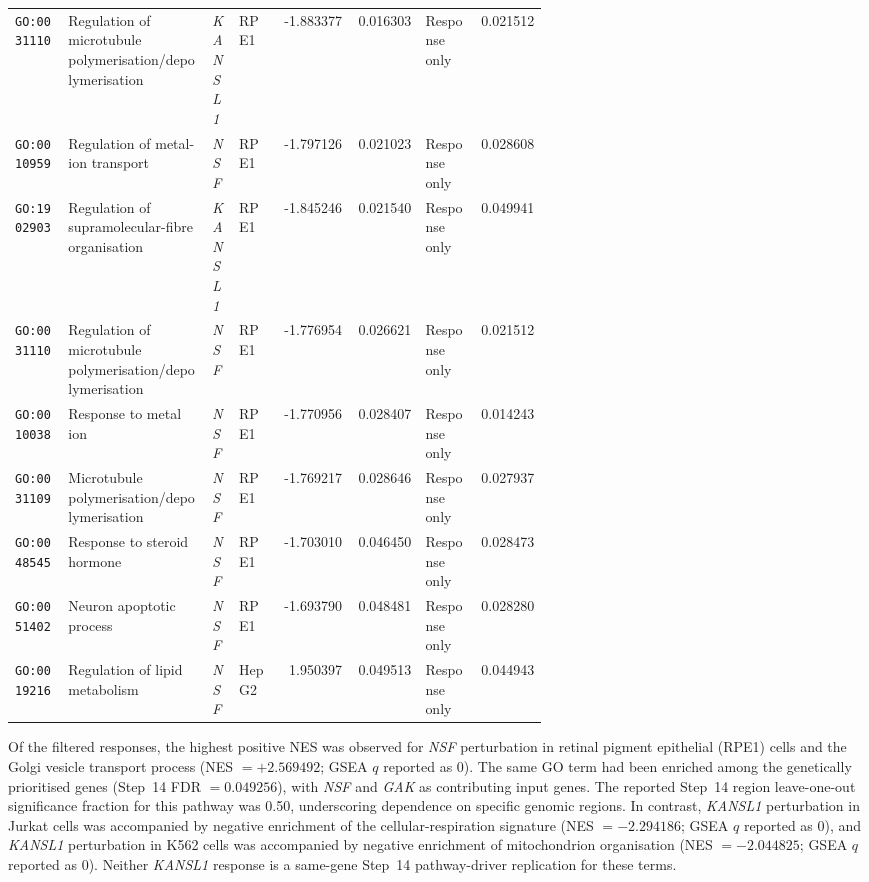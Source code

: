 \documentclass[11pt,a4paper]{article}
\begin{document}
\begin{landscape}
\begin{longtable}{@{}p{0.105\linewidth}p{0.275\linewidth}p{0.058\linewidth}p{0.085\linewidth}r r p{0.10\linewidth}r@{}}
\texttt{GO:0031110} & Regulation of microtubule polymerisation/depolymerisation & \textit{KANSL1} & RPE1 & -1.883377 & 0.016303 & Response only & 0.021512 \\

\texttt{GO:0010959} & Regulation of metal-ion transport & \textit{NSF} & RPE1 & -1.797126 & 0.021023 & Response only & 0.028608 \\

\texttt{GO:1902903} & Regulation of supramolecular-fibre organisation & \textit{KANSL1} & RPE1 & -1.845246 & 0.021540 & Response only & 0.049941 \\

\texttt{GO:0031110} & Regulation of microtubule polymerisation/depolymerisation & \textit{NSF} & RPE1 & -1.776954 & 0.026621 & Response only & 0.021512 \\

\texttt{GO:0010038} & Response to metal ion & \textit{NSF} & RPE1 & -1.770956 & 0.028407 & Response only & 0.014243 \\

\texttt{GO:0031109} & Microtubule polymerisation/depolymerisation & \textit{NSF} & RPE1 & -1.769217 & 0.028646 & Response only & 0.027937 \\

\texttt{GO:0048545} & Response to steroid hormone & \textit{NSF} & RPE1 & -1.703010 & 0.046450 & Response only & 0.028473 \\

\texttt{GO:0051402} & Neuron apoptotic process & \textit{NSF} & RPE1 & -1.693790 & 0.048481 & Response only & 0.028280 \\

\texttt{GO:0019216} & Regulation of lipid metabolism & \textit{NSF} & HepG2 & 1.950397 & 0.049513 & Response only & 0.044943 \\

\end{longtable}
\endgroup
\end{landscape}

\noindent Of the filtered responses, the highest positive NES was observed for \textit{NSF} perturbation in retinal pigment epithelial (RPE1) cells and the Golgi vesicle transport process (NES $=+2.569492$; GSEA $q$ reported as 0). The same GO term had been enriched among the genetically prioritised genes (Step~14 FDR $=0.049256$), with \textit{NSF} and \textit{GAK} as contributing input genes. The reported Step~14 region leave-one-out significance fraction for this pathway was 0.50, underscoring dependence on specific genomic regions. In contrast, \textit{KANSL1} perturbation in Jurkat cells was accompanied by negative enrichment of the cellular-respiration signature (NES $=-2.294186$; GSEA $q$ reported as 0), and \textit{KANSL1} perturbation in K562 cells was accompanied by negative enrichment of mitochondrion organisation (NES $=-2.044825$; GSEA $q$ reported as 0). Neither \textit{KANSL1} response is a same-gene Step~14 pathway-driver replication for these terms.
\end{document}
